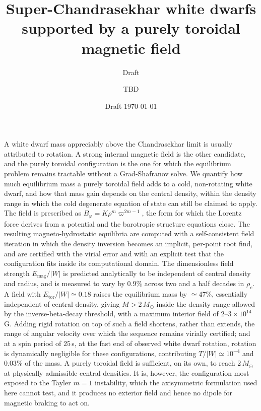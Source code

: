 \documentclass{aa}
\begin{document}
   \title{Super-Chandrasekhar white dwarfs supported by a purely
          toroidal magnetic field}

   \subtitle{Draft}

   \author{TBD
          }


   \date{Draft \today}

   \abstract
   {A white dwarf mass appreciably above the Chandrasekhar limit is
    usually attributed to rotation. A strong internal magnetic field is
    the other candidate, and the purely toroidal configuration is the
    one for which the equilibrium problem remains tractable without a
    Grad-Shafranov solve.}
   {We quantify how much equilibrium mass a purely toroidal field adds
    to a cold, non-rotating white dwarf, and how that mass gain depends
    on the central density, within the density range in which the cold
    degenerate equation of state can still be claimed to apply.}
   {The field is prescribed as $B_\varphi = K\rho^m\varpi^{2m-1}$,
    the form for which the Lorentz force derives from a potential and
    the barotropic structure equations close. The resulting
    magneto-hydrostatic equilibria are computed with a self-consistent
    field iteration in which the density inversion becomes an implicit,
    per-point root find, and are certified with the virial error and
    with an explicit test that the configuration fits inside its
    computational domain.}
   {The dimensionless field strength $E_{\mathrm{mag}}/|W|$ is predicted
    analytically to be independent of central density and radius, and is
    measured to vary by $0.9\%$ across two and a half decades in
    $\rho_c$. A field with $E_{\mathrm{tor}}/|W| \simeq 0.18$ raises the
    equilibrium mass by $\simeq 47\%$, essentially independent of
    central density, giving $M > 2\,M_\odot$ inside the density range
    allowed by the inverse-beta-decay threshold, with a maximum interior
    field of $2$--$3\times10^{14}$\,G. Adding rigid rotation on top of
    such a field shortens, rather than extends, the range of angular
    velocity over which the sequence remains virially certified; and at a
    spin period of $25$\,s, at the fast end of observed white dwarf
    rotation, rotation is dynamically negligible for these
    configurations, contributing $T/|W| \simeq 10^{-4}$ and $0.03\%$ of
    the mass.}
   {A purely toroidal field is sufficient, on its own, to reach
    $2\,M_\odot$ at physically admissible central densities. It is,
    however, the configuration most exposed to the Tayler $m=1$
    instability, which the axisymmetric formulation used here cannot
    test, and it produces no exterior field and hence no dipole for
    magnetic braking to act on.}
\end{document}
